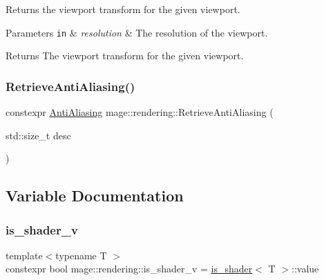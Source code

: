 Returns the viewport transform for the given viewport.


\begin{DoxyParams}[1]{Parameters}
\mbox{\tt in}  & {\em resolution} & The resolution of the viewport. \\
\hline
\end{DoxyParams}
\begin{DoxyReturn}{Returns}
The viewport transform for the given viewport. 
\end{DoxyReturn}
\mbox{\label{namespacemage_1_1rendering_a0e95130a488225f0525578cc6943a260}} 
\subsubsection{\texorpdfstring{Retrieve\+Anti\+Aliasing()}{RetrieveAntiAliasing()}}
{\footnotesize\ttfamily constexpr \mbox{\hyperlink{namespacemage_1_1rendering_ac3f75e49e92b42f2f5fb55c450d8899c}{Anti\+Aliasing}} mage\+::rendering\+::\+Retrieve\+Anti\+Aliasing (\begin{DoxyParamCaption}\item[{std\+::size\+\_\+t}]{desc }\end{DoxyParamCaption})\hspace{0.3cm}{\ttfamily [noexcept]}}



\subsection{Variable Documentation}
\mbox{\label{namespacemage_1_1rendering_a31fdbf9c96bd42e878e844c2b32b2fb9}} 
\subsubsection{\texorpdfstring{is\+\_\+shader\+\_\+v}{is\_shader\_v}}
{\footnotesize\ttfamily template$<$typename T $>$ \\
constexpr bool mage\+::rendering\+::is\+\_\+shader\+\_\+v = \mbox{\hyperlink{structmage_1_1rendering_1_1is__shader}{is\+\_\+shader}}$<$ T $>$\+::value}

